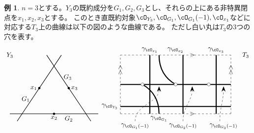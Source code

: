 \documentclass[uplatex,a4paper,dvipdfmx]{jsarticle}
\numberwithin{equation}{section}
\theoremstyle{definition}
\newtheorem{example}[theorem]{例}
\begin{document}
\begin{example}\label{correspondence_of_objects}
	$n=3$とする。$Y_3$の既約成分を$G_1, G_2, G_3$とし、それらの上にある非特異閉点を$x_1, x_2, x_3$とする。
	このとき直既約対象$\cO_{Y_3}, \cO_{G_1}, \cO_{G_1}(-1), \cO_{x_1}$などに対応する$T_3$上の曲線は以下の図のような曲線である。
	ただし白い丸は$T_3$の$3$つの穴を表す。
	\begin{displaymath}
		\begin{tikzpicture}[scale = 0.4]
			\draw(-10, 8) node{$Y_3$};
			\draw[thick] (-9,-1)--(-3,8);
			\draw[thick] (-10,0)--(2,0);
			\draw[thick] (1,-1)--(-5,8);

			\filldraw[black] (-6, 3.5) circle (4pt);
			\filldraw[black] (-4, 0) circle (4pt);
			\filldraw[black] (-2, 3.5) circle (4pt);

			\draw(-6, 3.5) node[left]{$x_1$};
			\draw(-4, 0) node[below]{$x_2$};
			\draw(-2, 3.5) node[right]{$x_3$};

			\draw(-7, 2) node[left]{$G_1$};
			\draw(-2, 0) node[below]{$G_2$};
			\draw(-3, 5) node[right]{$G_3$};

			\draw(22, 8) node{$T_3$};
			\draw[dashed] (5,0)--(20,0);
			\draw(14.75, 0) node{$>$};
			\draw[dashed] (5,0)--(5,8);
			\draw(5, 6) node{\rotatebox{90}{$>>$}};
			\draw[dashed] (5,8)--(20,8);
			\draw(14.75, 8) node{$>$};
			\draw[dashed] (20,0)--(20,8);
			\draw(20, 6) node{\rotatebox{90}{$>>$}};

			\draw[ultra thick] (5, 1)--(20, 1);
			\draw[ultra thick] (5, 4)--(20, 4);
			\draw(5, 1) node[left]{$\gamma_{\cO_{Y_3}}$};


			\draw[ultra thick] (8+1, 0)--(8+1, 8);
			\draw(8+1, 8) node[above]{$\gamma_{\cO_{x_1}}$};
			\draw[ultra thick] (12.5+1, 0)--(12.5+1, 8);
			\draw(12.5, 8) node[above]{$\gamma_{\cO_{x_2}}$};
			\draw[ultra thick] (17+1, 0)--(17+1, 8);
			\draw(17+1, 8) node[above]{$\gamma_{\cO_{x_3}}$};

			\draw[ultra thick] (8, 4) to[out=-30,in=90] (10.25, 0);
			\draw[ultra thick] (10.25, 8) to[out=-90,in=150] (12.5, 4);
			\draw(10.25, 0) node[below]{$\gamma_{\cO_{G_1}}$};
			\foreach \u in {8, 12.5, 17}
				{
					\filldraw[white] (\u, 4) circle (6pt);
					\draw[black] (\u, 4) circle (6pt);
				}

			\draw[dashed, -{Stealth[length=3mm]}] (7, -1) to[out=90, in=-90] (10.25, 3.75);
			\draw(7, -1) node[below]{$\gamma_{\cO_{G_1}(-1)}$};
			\draw[dashed, -{Stealth[length=3mm]}] (13.5, -1) to[out=90, in=-90] (14.75, 3.75);
			\draw(13.5, -1) node[below]{$\gamma_{\cO_{G_2}(-1)}$};
			\draw[dashed, -{Stealth[length=3mm]}] (18.5, -1) to[out=90, in=-90] (19, 3.75);
			\draw(19, -1) node[below]{$\gamma_{\cO_{G_3}(-1)}$};


\end{tikzpicture}
\end{displaymath}
\end{example}
\end{document}
